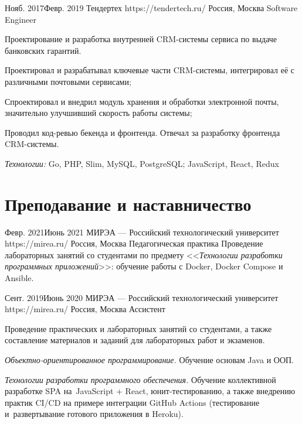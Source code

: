 \documentclass[10pt]{article}
\begin{document}
\job
	{Нояб. 2017}{Февр. 2019}
	{Тендертех}
	{https://tendertech.ru/}
	{Россия, Москва}
	{Software Engineer}
	{
	  Проектирование и разработка внутренней CRM-системы сервиса по выдаче банковских гарантий.

	  \begin{supercompactitemize}
		\item Проектировал и разрабатывал ключевые части CRM-системы, интегрировал её с различными почтовыми сервисами;
		\item Спроектировал и внедрил модуль хранения и обработки электронной почты, значительно улучшивший скорость работы системы;
		\item Проводил код-ревью бекенда и фронтенда. Отвечал за разработку фронтенда CRM-системы.
	  \end{supercompactitemize}

	  \textit{Технологии:} Go, PHP, Slim, MySQL, PostgreSQL; JavaScript, React, Redux
	}


\newpage


\section{Преподавание и наставничество}

\job
	{Февр. 2021}{Июнь 2021}
	{МИРЭА --- Российский технологический университет}
	{https://mirea.ru/}
	{Россия, Москва}
	{Педагогическая практика}
	{
	  Проведение лабораторных занятий со студентами по предмету <<\textit{Технологии разработки программных приложений}>>: обучение работы с Docker, Docker Compose и Ansible.
	}

\job
	{Сент. 2019}{Июнь 2020}
	{МИРЭА --- Российский технологический университет}
	{https://mirea.ru/}
	{Россия, Москва}
	{Ассистент}
	{
	  Проведение практических и лабораторных занятий со студентами, а также составление материалов и заданий для лабораторных работ и экзаменов.

	  \begin{supercompactitemize}
	  	\item \textit{Объектно-ориентированное программирование.} Обучение основам Java и ООП.
		\item \textit{Технологии разработки программного обеспечения.} Обучение коллективной разработке SPA на~JavaScript + React, юнит-тестированию, а также внедрению практик CI/CD на примере интеграции GitHub Actions (тестирование и~развертывание готового приложения в Heroku).
	  \end{supercompactitemize}
	}
\end{document}
